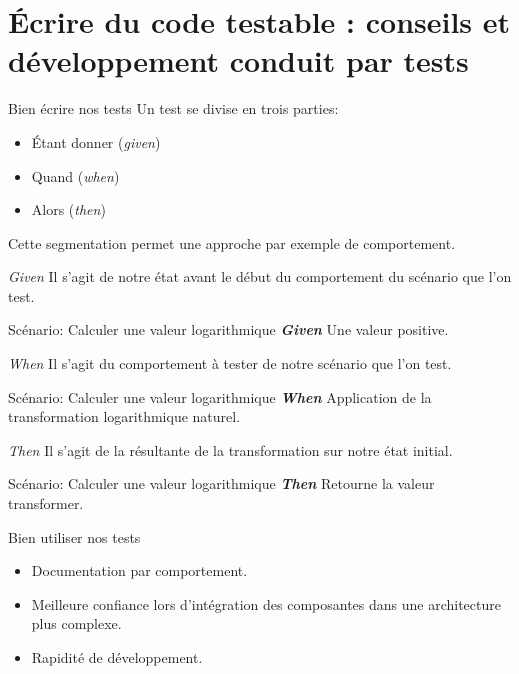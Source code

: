 \documentclass[11pt]{beamer}
\begin{document}
\section{Écrire du code testable : conseils et développement conduit par tests}

\begin{frame}{Bien écrire nos tests}
Un test se divise en trois parties:
\begin{itemize}
	\item Étant donner (\textit{given})
	\item Quand (\textit{when})
	\item Alors (\textit{then})
\end{itemize}
Cette segmentation permet une approche par exemple de comportement.

\end{frame}

\begin{frame}{\textit{Given}}
Il s'agit de notre état avant le début du comportement du scénario que l'on test.

\begin{block}{Scénario: Calculer une valeur logarithmique}
\textit{\textbf{Given}} Une valeur positive.
\end{block}
\end{frame}

\begin{frame}{\textit{When}}
Il s'agit du comportement à tester de notre scénario que l'on test.

\begin{block}{Scénario: Calculer une valeur logarithmique}
\textit{\textbf{When}} Application de la transformation logarithmique naturel. 
\end{block}
\end{frame}

\begin{frame}{\textit{Then}}
Il s'agit de la résultante de la transformation sur notre état initial.
\begin{block}{Scénario: Calculer une valeur logarithmique}
\textit{\textbf{Then}} Retourne la valeur transformer.
\end{block}
\end{frame}

\begin{frame}{Bien utiliser nos tests}
\begin{itemize}
\item Documentation par comportement.
\item Meilleure confiance lors d'intégration des composantes dans une architecture plus complexe.
\item Rapidité de développement.
\end{itemize}
\end{frame}
\end{document}
